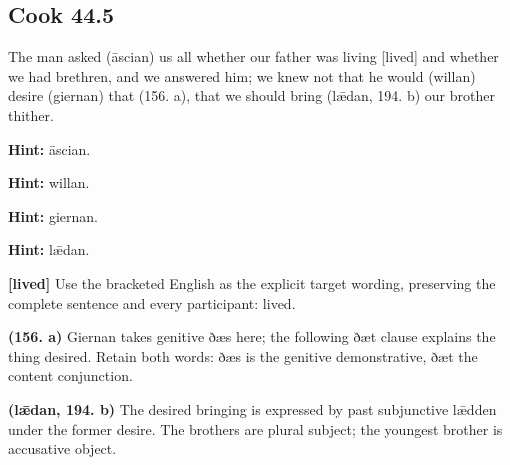 \par\begin{minipage}{\linewidth}\raggedright
\subsection*{Cook 44.5}

The man asked (āscian) us all whether our father was living [lived] and whether we had brethren, and we answered him; we knew not that he would (willan) desire (giernan) that (156. a), that we should bring (lǣdan, 194. b) our brother thither.

\textbf{Hint:} āscian.

\textbf{Hint:} willan.

\textbf{Hint:} giernan.

\textbf{Hint:} lǣdan.

\textbf{[lived]} Use the bracketed English as the explicit target wording, preserving the complete sentence and every participant: lived.

\textbf{(156. a)} Giernan takes genitive ðæs here; the following ðæt clause explains the thing desired. Retain both words: ðæs is the genitive demonstrative, ðæt the content conjunction.

\textbf{(lǣdan, 194. b)} The desired bringing is expressed by past subjunctive lǣdden under the former desire. The brothers are plural subject; the youngest brother is accusative object.

\end{minipage}\par\addvspace{4pt}

